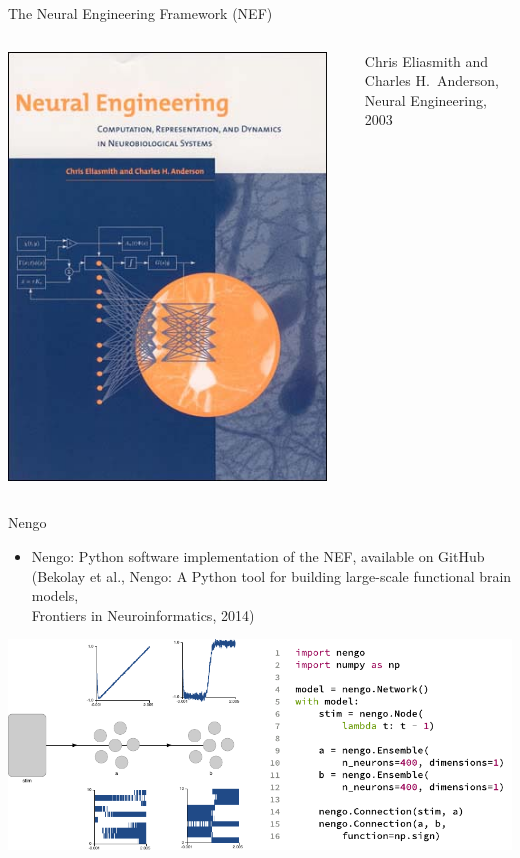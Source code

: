 \documentclass[aspectratio=169]{beamer}
\begin{document}
\begin{frame}{The Neural Engineering Framework (NEF)}
\begin{columns}[T]
		\includegraphics[width=0.95\textwidth]{media/nef_book.jpg}\\[0.1cm]
		\raggedright
		\footnotesize{\color{aluminium4}Chris Eliasmith and\\ Charles H.~Anderson,\\Neural Engineering, 2003}
	\end{columns}
\end{frame}

\begin{frame}{Nengo}
	\begin{itemize}
		\item Nengo: Python software implementation of the NEF, available on GitHub\\ \footnotesize\textcolor{aluminium4}{(Bekolay et al., Nengo: A Python tool for building large-scale functional brain models,\\Frontiers in Neuroinformatics, 2014)}
	\end{itemize}
	\vspace{0.1cm}
	\includegraphics[width=\textwidth]{media/nengo_example.pdf}
\end{frame}
\end{document}
